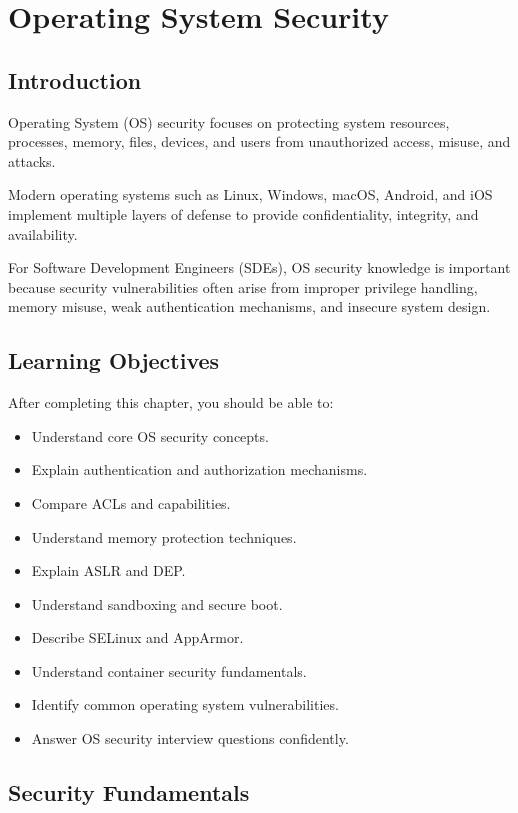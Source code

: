 \chapter{Operating System Security}

\section{Introduction}

Operating System (OS) security focuses on protecting system resources, processes, memory, files, devices, and users from unauthorized access, misuse, and attacks.

Modern operating systems such as Linux, Windows, macOS, Android, and iOS implement multiple layers of defense to provide confidentiality, integrity, and availability.

For Software Development Engineers (SDEs), OS security knowledge is important because security vulnerabilities often arise from improper privilege handling, memory misuse, weak authentication mechanisms, and insecure system design.

\section{Learning Objectives}

After completing this chapter, you should be able to:

\begin{itemize}
\item Understand core OS security concepts.
\item Explain authentication and authorization mechanisms.
\item Compare ACLs and capabilities.
\item Understand memory protection techniques.
\item Explain ASLR and DEP.
\item Understand sandboxing and secure boot.
\item Describe SELinux and AppArmor.
\item Understand container security fundamentals.
\item Identify common operating system vulnerabilities.
\item Answer OS security interview questions confidently.
\end{itemize}

\section{Security Fundamentals}

